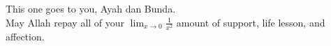 \vspace{7cm}

\begin{center}
    This one goes to you, Ayah dan Bunda.\\
    \vspace{0.5cm}
    May Allah repay all of your $\displaystyle{\lim_{x \to 0} \frac{1}{x^2}}$ amount of support, life lesson, and affection.
\end{center}
